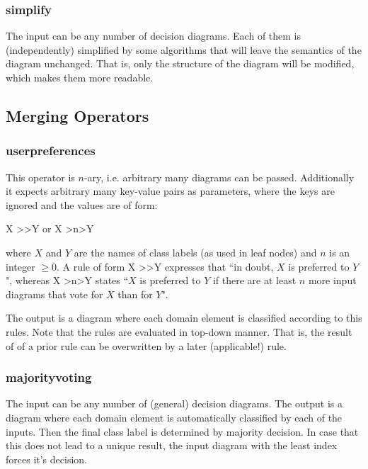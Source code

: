 \documentclass[a4paper,11pt]{article}
\theoremstyle{definition}
\newcommand{\inlinecode}[1]{\textsf{#1}\xspace }
\begin{document}
			\subsubsection{simplify}
			
				The input can be any number of decision diagrams. Each of them is (independently) simplified by some algorithms that will leave the semantics of the diagram unchanged.
				That is, only the structure of the diagram will be modified, which makes them more readable.
			
		
		\subsection{Merging Operators}
		\label{sec:Operators:Merging}
		
			\subsubsection{userpreferences}

				This operator is $n$-ary, i.e. arbitrary many diagrams can be passed. Additionally it expects arbitrary many key-value pairs as parameters, where the keys are ignored
				and the values are of form:
				\begin{center}
					\inlinecode{X \textgreater \textgreater Y} or \inlinecode{X \textgreater n\textgreater Y}
				\end{center}
				where $X$ and $Y$ are the names of class labels (as used in leaf nodes) and $n$ is an integer $\ge 0$. A rule of form \inlinecode{X \textgreater \textgreater Y}
				expresses that ``in doubt, $X$ is preferred to $Y$", whereas \inlinecode{X \textgreater n\textgreater Y} states ``$X$ is preferred to $Y$ if there are at least $n$
				more input diagrams that vote for $X$ than for $Y$".

				The output is a diagram where each domain element is classified according to this rules. Note that the rules are evaluated in top-down manner. That is, the result of
				of a prior rule can be overwritten by a later (applicable!) rule.


			\subsubsection{majorityvoting}
			
				The input can be any number of (general) decision diagrams. The output is a diagram where each domain element is automatically classified by each of the inputs. Then the
				final class label is determined by majority decision. In case that this does not lead to a unique result, the input diagram with the least index forces it's decision.
			
\end{document}
